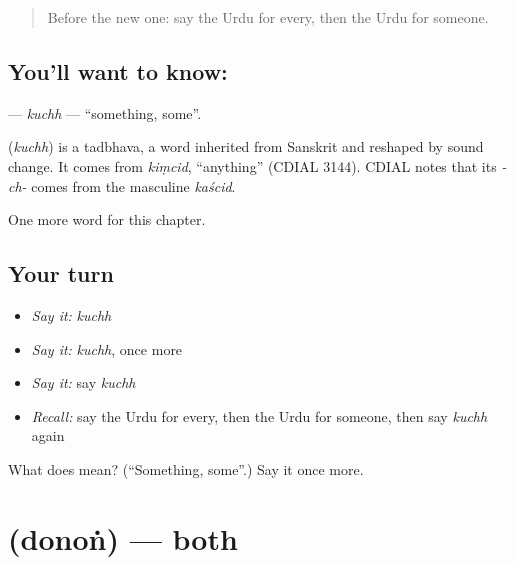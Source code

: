\label{lesson:UR-C89-kuchh}



\begin{quote}
Before the new one: say the Urdu for every, then the Urdu for someone.
\end{quote}

\subsection*{You'll want to know: }
\textbf{} — \emph{kuchh} — \textquotedblleft{}something, some\textquotedblright{}.

\begin{cousinweb}
\textbf{} (\emph{kuchh}) is a tadbhava, a word inherited from Sanskrit and reshaped by sound change. It comes from \emph{kiṃcid}, \textquotedblleft{}anything\textquotedblright{} (CDIAL 3144). CDIAL notes that its \emph{-ch-} comes from the masculine \emph{kaścid}.
\end{cousinweb}

\begin{grammarlens}[title={What you've built}]
One more word for this chapter.
\end{grammarlens}

\subsection*{Your turn}
\begin{itemize}
\raggedright
  \item \emph{Say it:} \emph{kuchh}
  \item \emph{Say it:} \emph{kuchh}, once more
  \item \emph{Say it:} say \emph{kuchh}
  \item \emph{Recall:} say the Urdu for every, then the Urdu for someone, then say \emph{kuchh} again
\end{itemize}

\begin{tcolorbox}[breakable,colback=teal!4,colframe=teal!35!black,title={Before you move on}]
What does  mean? (\textquotedblleft{}Something, some\textquotedblright{}.) Say it once more.
\end{tcolorbox}
\section[\texorpdfstring{\ur{دونوں} (donoṅ)}{دونوں (donoṅ)}]{ (donoṅ) — both}

